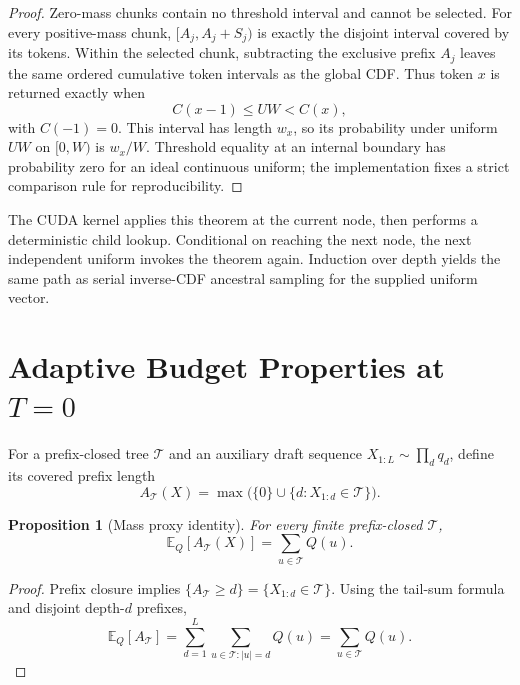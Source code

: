\documentclass{article}
\newtheorem{proposition}{Proposition}
\newcommand{\T}{\mathcal{T}}
\newcommand{\E}{\mathbb{E}}
\begin{document}
\begin{proof}
Zero-mass chunks contain no threshold interval and cannot be selected.  For every positive-mass chunk, $[A_j,A_j+S_j)$ is exactly the disjoint interval covered by its tokens.  Within the selected chunk, subtracting the exclusive prefix $A_j$ leaves the same ordered cumulative token intervals as the global CDF.  Thus token $x$ is returned exactly when
\begin{equation}
C(x-1)\le UW<C(x),
\end{equation}
with $C(-1)=0$.  This interval has length $w_x$, so its probability under uniform $UW$ on $[0,W)$ is $w_x/W$.  Threshold equality at an internal boundary has probability zero for an ideal continuous uniform; the implementation fixes a strict comparison rule for reproducibility.
\end{proof}

The CUDA kernel applies this theorem at the current node, then performs a deterministic child lookup.  Conditional on reaching the next node, the next independent uniform invokes the theorem again.  Induction over depth yields the same path as serial inverse-CDF ancestral sampling for the supplied uniform vector.

\section{Adaptive Budget Properties at \texorpdfstring{$T=0$}{T=0}}
\label{app:adaptiveproof}

For a prefix-closed tree $\T$ and an auxiliary draft sequence $X_{1:L}\sim\prod_dq_d$, define its covered prefix length
\begin{equation}
A_{\T}(X)=\max\bigl(\{0\}\cup\{d:X_{1:d}\in\T\}\bigr).
\end{equation}

\begin{proposition}[Mass proxy identity]
For every finite prefix-closed $\T$,
\begin{equation}
\E_Q[A_\T(X)]=\sum_{u\in\T}Q(u).
\end{equation}
\end{proposition}

\begin{proof}
Prefix closure implies $\{A_\T\ge d\}=\{X_{1:d}\in\T\}$.  Using the tail-sum formula and disjoint depth-$d$ prefixes,
\begin{equation}
\E_Q[A_\T]=\sum_{d=1}^{L}\sum_{u\in\T:|u|=d}Q(u)=\sum_{u\in\T}Q(u).
\end{equation}
\end{proof}
\end{document}
